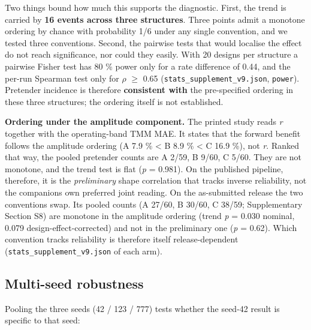 \documentclass[11pt,a4paper]{article}
\begin{document}
Two things bound how much this supports the diagnostic. First, the trend is carried by
\textbf{16 events across three structures}. Three points admit a monotone ordering by chance
with probability 1/6 under any single convention, and we tested three conventions. Second,
the pairwise tests that would localise the effect do not reach significance, nor could
they easily. With 20 designs per structure a pairwise Fisher test has 80 \% power only for
a rate difference of 0.44, and the per-run Spearman test only for \textbar \ensuremath{\rho}\textbar{} \ensuremath{\geq} 0.65
(\texttt{stats\_\allowbreak{}supplement\_\allowbreak{}v9.\allowbreak{}json}, \texttt{power}). Pretender incidence is therefore \textbf{consistent with} the pre-specified ordering in these three structures; the ordering itself is not established.

\textbf{Ordering under the amplitude component.} The printed study reads \emph{r} together with the
operating-band TMM MAE. It states that the forward benefit follows the amplitude ordering
(A 7.9 \% \textless{} B 8.9 \% \textless{} C 16.9 \%), not \emph{r}. Ranked that way, the pooled pretender counts are
A 2/59, B 9/60, C 5/60. They are not monotone, and the trend test is flat (\emph{p} = 0.981).
On the published pipeline, therefore, it is the \emph{preliminary} shape correlation that
tracks inverse reliability, not the companion\textquotesingle s own preferred joint reading. On the
as-submitted release the two conventions swap. Its pooled counts (A 27/60, B 30/60,
C 38/59; Supplementary Section S8) are monotone in the amplitude ordering (trend
\emph{p} = 0.030 nominal, 0.079 design-effect-corrected) and not in the preliminary one
(\emph{p} = 0.62). Which convention tracks reliability is therefore itself release-dependent
(\texttt{stats\_\allowbreak{}supplement\_\allowbreak{}v9.\allowbreak{}json} of each arm).

\subsection{Multi-seed robustness}\label{sec:3.4}

Pooling the three seeds (42 / 123 / 777) tests whether the seed-42 result is specific to that seed:
\end{document}

